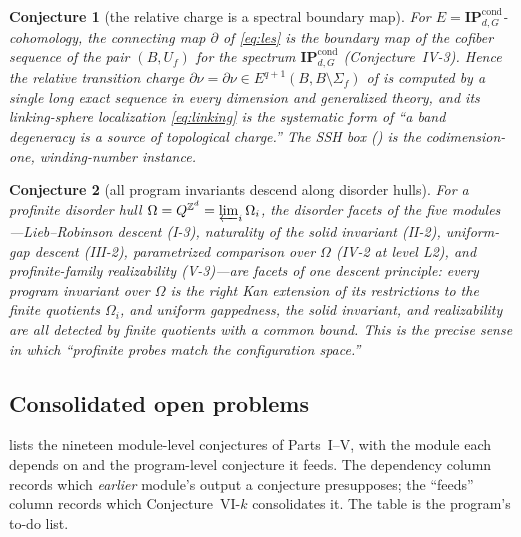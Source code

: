 \documentclass[12pt]{article}
\newcommand{\IPcond}{\mathbf{IP}^{\mathrm{cond}}}  %
\newcommand{\Sig}{\Sigma}                       %
\newcommand{\rc}{\partial\nu}                   %
\newcommand{\dis}{\Omega}                       %
\newcommand{\ZZ}{\mathbb{Z}}
\theoremstyle{plain}
\newtheorem{progconj}{Conjecture}
\theoremstyle{definition}
\theoremstyle{remark}
\begin{document}
\begin{progconj}[the relative charge is a spectral boundary map]
\label{conj:VI3}
For $E=\IPcond_{d,G}$-cohomology, the connecting map $\partial$ of \eqref{eq:les} is the
boundary map of the cofiber sequence of the pair $(B,U_f)$ for the spectrum
$\IPcond_{d,G}$ (Conjecture~IV-3). Hence the relative transition charge
$\rc=\partial\nu\in E^{q+1}(B,B\setminus\Sig_f)$ of  is computed by a
single long exact sequence in every dimension and generalized theory, and its
linking-sphere localization \eqref{eq:linking} is the systematic form of ``a band
degeneracy is a source of topological charge.'' The SSH box () is the
codimension-one, winding-number instance.
\end{progconj}

\begin{progconj}[all program invariants descend along disorder hulls]
\label{conj:VI4}
For a profinite disorder hull $\dis=Q^{\ZZ^d}=\varprojlim_i\dis_i$, the disorder facets
of the five modules---Lieb--Robinson descent (I-3), naturality of the solid invariant
(II-2), uniform-gap descent (III-2), parametrized comparison over $\dis$ (IV-2 at level
L2), and profinite-family realizability (V-3)---are facets of one descent principle: every
program invariant over $\dis$ is the right Kan extension of its restrictions to the finite
quotients $\dis_i$, and uniform gappedness, the solid invariant, and realizability are all
detected by finite quotients with a common bound. This is the precise sense in which
``profinite probes match the configuration space.''
\end{progconj}

\subsection{Consolidated open problems}
\label{sec:opentable}

 lists the nineteen module-level conjectures of Parts~I--V, with the
module each depends on and the program-level conjecture it feeds. The dependency column
records which \emph{earlier} module's output a conjecture presupposes; the ``feeds''
column records which Conjecture~VI-$k$ consolidates it. The table is the program's
to-do list.
\end{document}
